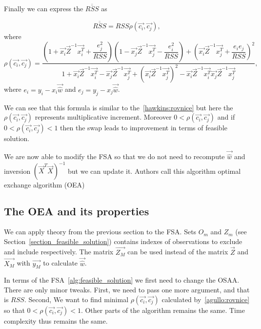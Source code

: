Finally we can express the $\overline{\overline{RSS}} $ as

\begin{equation} \label{updaterss}
    \overline{\overline{RSS}}  = RSS\rho(\vec{c_i}, \vec{c_j}),
\end{equation}
where
\begin{equation} \label{agullo:rovnice}
    \rho(\vec{c_i}, \vec{c_j}) =
     \dfrac
     {(1+\vec{x_i}\vec{Z}^{-1}\vec{x_i^T} + \dfrac{e_j^2}{RSS})
        (1 - \vec{x_j}\vec{Z}^{-1}\vec{x_j^T} - \dfrac{e_i^2}{RSS} )+
        (\vec{x_i}\vec{Z}^{-1}\vec{x_j^T} + \dfrac{e_i e_j}{RSS} )^2}
    {1 + \vec{x_i}\vec{Z}^{-1}\vec{x_i^T}  - \vec{x_j}\vec{Z}^{-1}\vec{x_j^T}  + ( \vec{x_i}\vec{Z}^{-1}\vec{x_j^T})^2 -   \vec{x_i}\vec{Z}^{-1}\vec{x_i^T}\vec{x_j}\vec{Z}^{-1}\vec{x_j^T} },
\end{equation}
where $e_i = y_i - x_i\vec{\hat{w}}$ and $e_j = y_j - x_j\vec{\hat{w}}$.

We can see that this formula is similar to the~\eqref{hawkins:rovnice} but here the $\rho(\vec{c_i}, \vec{c_j})$ represents multiplicative increment. Moreover $0 < \rho(\vec{c_i}, \vec{c_j}) $ and if $0 < \rho(\vec{c_i}, \vec{c_j})< 1$ then the swap leads to improvement in terms of feasible solution.

We are now able to modify the FSA so that we do not need to recompute $\vec{\hat{w}}$ and inversion $(\vec{X}^T \vec{X})^{-1}$ but we can update it. Authors call this algorithm optimal exchange algorithm (OEA)






\subsection{The OEA and its properties}
We can apply theory from the previous section to the FSA. Sets $O_m$ and $Z_m$ (see Section~\ref{section_feasible_solution}) contains indexes of observations to exclude and include respectively.
The matrix $\vec{Z_M}$ can be used instead of the matrix $\vec{Z}$ and
 $\vec{X_M}$ with $\vec{y_M}$ to calculate $\vec{\hat{w}}$. 

In terms of the FSA~\ref{alg:feasible_solution} we first need to change the OSAA.  There are only minor tweaks. First, we need to pass one more argument, and that is $RSS$. Second, We want to find minimal $\rho(\vec{c_i}, \vec{c_j})$ calculated by~\eqref{agullo:rovnice} so that $0 < \rho(\vec{c_i}, \vec{c_j}) < 1 $. Other parts of the algorithm remains the same. Time complexity thus remains the same.

